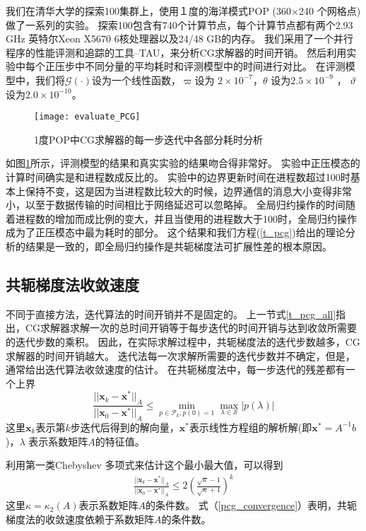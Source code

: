 
我们在清华大学的探索100集群上，使用１度的海洋模式POP (360$\times$240 个网格点)做了一系列的实验。 
探索100包含有740个计算节点，每个计算节点都有两个2.93 GHz 英特尔Xeon X5670 6核处理器以及24/48 GB的内存。 
我们采用了一个并行程序的性能评测和追踪的工具--TAU\cite{shende2006tau}，来分析CG求解器的时间开销。 
然后利用实验中每个正压步中不同分量的平均耗时和评测模型中的时间进行对比。 
在评测模型中，我们将$\mathcal{G}(\cdot)$设为一个线性函数，$\varpi$设为 $2\times 10^{-7}$，$\theta$ 设为$2.5\times 10^{-9}$ ， $\vartheta$  设为$2.0\times 10^{-10}$。 


\begin{figure}[ht]
\centering
\texttt{[image: evaluate\_PCG]}
\caption[] {1度POP中CG求解器的每一步迭代中各部分耗时分析\label{fig:pcg_ratio}}
\end{figure}
如图\ref{fig:pcg_ratio}所示，评测模型的结果和真实实验的结果吻合得非常好。 
实验中正压模态的计算时间确实是和进程数成反比的。 
实验中的边界更新时间在进程数超过100时基本上保持不变，这是因为当进程数比较大的时候，边界通信的消息大小变得非常小，以至于数据传输的时间相比于网络延迟可以忽略掉。 
全局归约操作的时间随着进程数的增加而成比例的变大，并且当使用的进程数大于100时，全局归约操作成为了正压模态中最为耗时的部分。 
这个结果和我们方程(\ref{t_pcg})给出的理论分析的结果是一致的，即全局归约操作是共轭梯度法可扩展性差的根本原因。 

\subsection{共轭梯度法收敛速度} \label{solver:CG:convergence_rate}

不同于直接方法，迭代算法的时间开销并不是固定的。
上一节式\ref{t_pcg_all}指出，CG求解器求解一次的总时间开销等于每步迭代的时间开销与达到收敛所需要的迭代步数的乘积。
因此，在实际求解过程中，共轭梯度法的迭代步数越多，CG求解器的时间开销越大。 
迭代法每一次求解所需要的迭代步数并不确定，但是，通常给出迭代算法收敛速度的估计。
在共轭梯度法中，每一步迭代的残差都有一个上界\cite{Liesen2004}
\begin{equation}
\frac{||\textbf{x}_k-\textbf{x}^*||_A }{||\textbf{x}_0-\textbf{x}^*||_A}  \le \min_{p\in \mathcal{P}_k, p(0) = 1 }\max_{\lambda \in \mathcal{S}} |p(\lambda)| \label{PcgConvergeRate}
\end{equation}
这里$\textbf{x}_k$表示第$k$步迭代后得到的解向量，$\textbf{x}^*$表示线性方程组的解析解(即$\textbf{x}^* = A^{-1}b$)，$\lambda$ 表示系数矩阵$A$的特征值。

利用第一类Chebyshev 多项式来估计这个最小最大值，可以得到 
\begin{align}
\label{pcg_convergence}
\frac{||\textbf{x}_k-\textbf{x}^*||_A}{||\textbf{x}_0-\textbf{x}^*||_A}\le  2 (\frac{\sqrt{\kappa}-1}{\sqrt{\kappa}+1})^k
\end{align}
这里$\kappa =  \kappa_2(A)$表示系数矩阵$A$的条件数。
式（\ref{pcg_convergence}）表明，共轭梯度法的收敛速度依赖于系数矩阵$A$的条件数。

